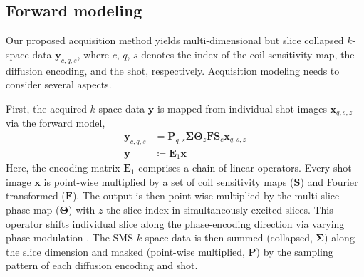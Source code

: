 \documentclass[preprint,12pt,authoryear,review]{elsarticle}
\begin{document}
    \pagebreak

    \subsection{Forward modeling}
    Our proposed acquisition method yields multi-dimensional but
    slice collapsed $k$-space data $\mathbf{y}_{c,q,s}$,
    where $c$, $q$, $s$ denotes the index of the coil sensitivity map,
    the diffusion encoding, and the shot, respectively.
    Acquisition modeling needs to consider several aspects.

    First, the acquired $k$-space data $\mathbf{y}$ is mapped from
    individual shot images $\mathbf{x}_{q,s,z}$ via the forward model,
    \begin{align}
        \mathbf{y}_{c,q,s} &= \mathbf{P}_{q,s} \mathbf{\Sigma} \mathbf{\Theta}_{z} \mathbf{F} \mathbf{S}_c \mathbf{x}_{q,s,z} \\
        \mathbf{y} &\coloneqq \mathbf{E}_1 \mathbf{x} \label{EQU:model_shot}
    \end{align}
    Here, the encoding matrix $\mathbf{E}_1$ comprises a chain of linear operators.
    Every shot image $\mathbf{x}$ is point-wise multiplied
    by a set of coil sensitivity maps ($\mathbf{S}$) and Fourier transformed ($\mathbf{F}$).
    The output is then point-wise multiplied by the multi-slice phase map ($\mathbf{\Theta}$)
    with $z$ the slice index in simultaneously excited slices.
    This operator shifts individual slice along the phase-encoding direction
    via varying phase modulation \citep{breuer_2005_caipi}.
    The SMS $k$-space data is then
    summed (collapsed, $\mathbf{\Sigma}$) along the slice dimension and
    masked (point-wise multiplied, $\mathbf{P}$) by
    the sampling pattern of each diffusion encoding and shot.
\end{document}
